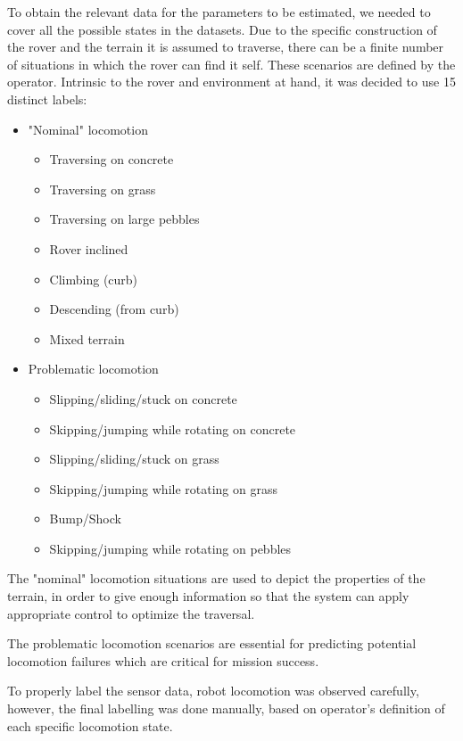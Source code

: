 \documentclass[a4paper, 10pt, conference]{ieeeconf}
\begin{document}
To obtain the relevant data for the parameters to be estimated, we needed to cover all the possible states in the datasets. 
Due to the specific construction of the rover and the terrain it is assumed to traverse, there can be a finite number of situations in which the rover can find it self. These scenarios are defined by the operator.
Intrinsic to the rover and environment at hand, it was decided to use 15 distinct labels:
\begin{itemize}
	\item "Nominal" locomotion
		\begin{itemize}
			\item Traversing on concrete
			\item Traversing on grass
			\item Traversing on large pebbles
			\item Rover inclined
			\item Climbing (curb)
			\item Descending (from curb)
			\item Mixed terrain
		\end{itemize}
		
	\item Problematic locomotion
		\begin{itemize}
			\item Slipping/sliding/stuck on concrete
			\item Skipping/jumping while rotating on concrete
			\item Slipping/sliding/stuck on grass
			\item Skipping/jumping while rotating on grass
			\item Bump/Shock
			\item Skipping/jumping while rotating on pebbles
		\end{itemize}
\end{itemize}

The "nominal" locomotion situations are used to depict the properties of the terrain, in order to give enough information so that the system can apply appropriate control to optimize the traversal.

The problematic locomotion scenarios are essential for predicting potential locomotion failures which are critical for mission success.

To properly label the sensor data, robot locomotion was observed carefully, however, the final labelling was done manually, based on operator's definition of each specific locomotion state.
\end{document}

